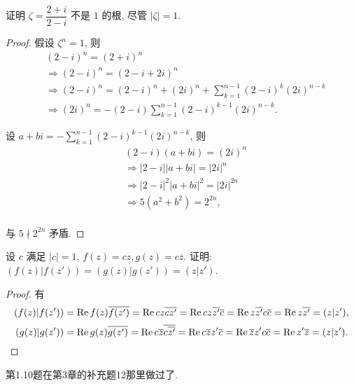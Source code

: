 \documentclass[color=black,device=normal,lang=cn,mode=geye]{elegantnote}
\begin{document}
\begin{exercise}%
    证明 $\zeta=\dfrac{2+i}{2-i}$ 不是 $1$ 的根, 尽管 $|\zeta|=1$.
\end{exercise}
\begin{proof}
    假设 $\zeta^n=1$, 则
    \begin{align*}
        & (2-i)^n=(2+i)^n \\
        & \Rightarrow(2-i)^n=(2-i+2i)^n \\
        & \Rightarrow(2-i)^n=(2-i)^n+(2i)^n+\sum\limits_{k=1}^{n-1}(2-i)^k(2i)^{n-k} \\
        & \Rightarrow(2i)^n=-(2-i)\sum\limits_{k=1}^{n-1}(2-i)^{k-1}(2i)^{n-k}.
    \end{align*}

    设 $a+bi=-\sum\limits_{k=1}^{n-1}(2-i)^{k-1}(2i)^{n-k}$, 则
    \begin{align*}
        & (2-i)(a+bi)=(2i)^n \\
        & \Rightarrow|2-i||a+bi|=|2i|^n \\
        & \Rightarrow|2-i|^2|a+bi|^2=|2i|^{2n} \\
        & \Rightarrow5(a^2+b^2)=2^{2n}, \\
    \end{align*}

    与 $5\nmid2^{2n}$ 矛盾.
\end{proof}
\begin{exercise}%
    设 $c$ 满足 $|c|=1$, $f(z)=cz,g(z)=c\overline{z}$. 证明: $(f(z)|f(z'))=(g(z)|g(z'))=(z|z')$.
\end{exercise}
\begin{proof}
    有
    \[(f(z)|f(z'))=\operatorname{Re} f(z)\overline{f(z')}=\operatorname{Re} cz\overline{cz'}=\operatorname{Re} cz\overline{z'}\overline{c}=\operatorname{Re} z\overline{z'}c\overline{c}=\operatorname{Re} z\overline{z'}=(z|z'),\]
    \[(g(z)|g(z'))=\operatorname{Re} g(z)\overline{g(z')}=\operatorname{Re} c\overline{z}\overline{c\overline{z'}}=\operatorname{Re} c\overline{z}z'\overline{c}=\operatorname{Re}\overline{z}z'c\overline{c}=\operatorname{Re} z'\overline{z}=(z|z').\qedhere\]
\end{proof}

第1.10题在第3章的补充题12那里做过了.
\end{document}
